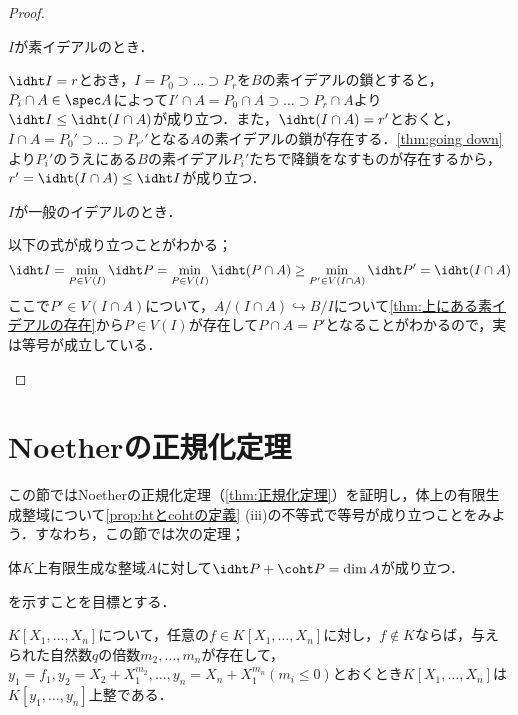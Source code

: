 \begin{proof}
	\begin{step}
		\item $I$が素イデアルのとき．
		
		$\idht I=r$とおき，$I=P_0\supset\dots\supset P_r$を$B$の素イデアルの鎖とすると，$P_i\cap A\in\spec A$によって$I'\cap A=P_0\cap A\supset\dots\supset P_r\cap A$より$\idht I\leq \idht (I\cap A)$が成り立つ．また，$\idht (I\cap A)=r'$とおくと，$I\cap A=P_0'\supset\dots\supset P_{r'}'$となる$A$の素イデアルの鎖が存在する．\ref{thm:going down}より$P_i'$のうえにある$B$の素イデアル$P_i'$たちで降鎖をなすものが存在するから，$r'=\idht(I\cap A)\leq\idht I$が成り立つ．
		
		\item $I$が一般のイデアルのとき．
		
		以下の式が成り立つことがわかる；
		\[\idht I=\min_{P\in V(I)}\idht P=\min_{P\in V(I)}\idht (P\cap A)\geq\min_{P'\in V(I\cap A)}\idht P'=\idht (I\cap A)\]
		ここで$P'\in V(I\cap A)$について，$A/(I\cap A)\hookrightarrow B/I$について\ref{thm:上にある素イデアルの存在}から$P\in V(I)$が存在して$P\cap A=P'$となることがわかるので，実は等号が成立している．
	\end{step}
\end{proof}

\section{Noetherの正規化定理}
この節ではNoetherの正規化定理（\ref{thm:正規化定理}）を証明し，体上の有限生成整域について\ref{prop:htとcohtの定義} (iii)の不等式で等号が成り立つことをみよう．すなわち，この節では次の定理；
\begin{thm}\label{thm:次元公式}
	体$K$上有限生成な整域$A$に対して$\idht P +\coht P =\dim A$が成り立つ．
\end{thm}
を示すことを目標とする．
%
%
%

\begin{lem}\label{lem:正規化の補題1}
	$K[X_1,\dots,X_n]$について，任意の$f\in K[X_1,\dots,X_n]$に対し，$f\not\in K$ならば，与えられた自然数$q$の倍数$m_2,\dots,m_n$が存在して，$y_1=f_1,y_2=X_2+X_1^{m_2},\dots,y_n=X_n+X_1^{m_n} (m_i\leq0)$とおくとき$K[X_1,\dots,X_n]$は$K[y_1,\dots,y_n]$上整である．
\end{lem}

